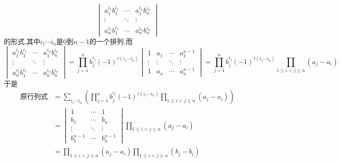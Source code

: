 \documentclass{ctexart}
\begin{document}
\begin{solution}
\begin{enumerate}[label=\tbf{(\arabic*)},topsep=0pt,parsep=0pt,itemsep=0pt,partopsep=0pt]
    \[\begin{vmatrix}
        a_1^{i_1}b_1^{i_1}&\cdots&a_1^{i_n}b_n^{i_n}\\
        \vdots&\ddots&\vdots\\
        a_n^{i_1}b_1^{i_1}&\cdots&a_n^{i_n}b_n^{i_n}
    \end{vmatrix}\]
    的形式,其中$i_1\cdots i_n$是$0$到$n-1$的一个排列.而
    \[\begin{vmatrix}
        a_1^{i_1}b_1^{i_1}&\cdots&a_1^{i_n}b_n^{i_n}\\
        \vdots&\ddots&\vdots\\
        a_n^{i_1}b_1^{i_1}&\cdots&a_n^{i_n}b_n^{i_n}
    \end{vmatrix}=\prod_{j=1}^{n}b_j^{i_j}(-1)^{\tau\left(i_1\cdots i_n\right)}\begin{vmatrix}
        1&a_1&\cdots&a_1^{n-1}\\
        \vdots&\vdots&\ddots&\vdots\\
        1&a_n&\cdots&a_n^{n-1}
    \end{vmatrix}
    =\prod_{j=1}^{n}b_j^{i_j}(-1)^{\tau\left(i_1\cdots i_n\right)}\prod_{1\leqslant i<j\leqslant n}\left(a_j-a_i\right)\]
    于是
    \[\begin{aligned}
        \text{原行列式}
        &=\sum_{i_1\cdots i_n}\left(\prod_{j=1}^{n}b_j^{i_j}(-1)^{\tau\left(i_1\cdots i_n\right)}\prod_{1\leqslant i<j\leqslant n}\left(a_j-a_i\right)\right)\\
        &=\begin{vmatrix}
        1&\cdots&1\\
        b_1&\cdots&b_n\\
        \vdots&\ddots&\vdots\\
        b_1^{n-1}&\cdots&b_n^{n-1}
    \end{vmatrix}\prod_{1\leqslant i<j\leqslant n}\left(a_j-a_i\right)\\
    &= \prod_{1\leqslant i<j\leqslant n}\left(a_j-a_i\right)\prod_{1\leqslant i<j\leqslant n}\left(b_j-b_i\right)
    \end{aligned}\]
\end{enumerate}
\end{solution}
\end{document}
